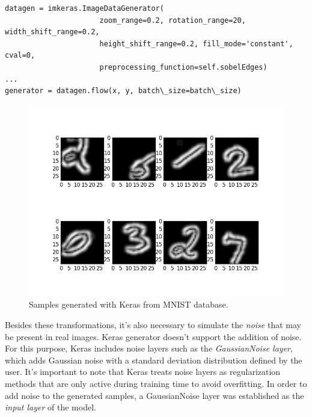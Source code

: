 \begin{lstlisting}
datagen = imkeras.ImageDataGenerator(
	                  zoom_range=0.2, rotation_range=20, width_shift_range=0.2, 
	                  height_shift_range=0.2, fill_mode='constant', cval=0,
	                  preprocessing_function=self.sobelEdges)
...	              
generator = datagen.flow(x, y, batch\_size=batch\_size)
\end{lstlisting}

\begin{figure}
	\centering
	\includegraphics[width=12cm, keepaspectratio]{figures/aug_keras.png}
	\caption{Samples generated with Keras from MNIST database.}
	\label{fig:aug_keras}
\end{figure}

Besides these transformations, it's also necessary to simulate the \emph{noise} that may be present in real images. Keras generator doesn't support the addition of noise. For this purpose, Keras includes noise layers such as the \emph{GaussianNoise layer}, which adds Gaussian noise with a standard deviation distribution defined by the user. It's important to note that Keras treats noise layers as regularization methods that are only active during training time to avoid overfitting. In order to add noise to the generated samples, a GaussianNoise layer was established as the \emph{input layer} of the model.

